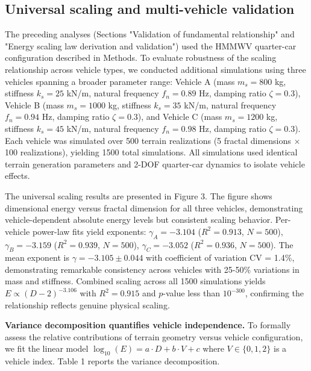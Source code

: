\documentclass[11pt]{article}
\begin{document}
\subsection*{Universal scaling and multi-vehicle validation}

The preceding analyses (Sections "Validation of fundamental relationship" and "Energy scaling law derivation and validation") used the HMMWV quarter-car configuration described in Methods. To evaluate robustness of the scaling relationship across vehicle types, we conducted additional simulations using three vehicles spanning a broader parameter range: Vehicle A (mass $m_s = 800$ kg, stiffness $k_s = 25$ kN/m, natural frequency $f_n = 0.89$ Hz, damping ratio $\zeta = 0.3$), Vehicle B (mass $m_s = 1000$ kg, stiffness $k_s = 35$ kN/m, natural frequency $f_n = 0.94$ Hz, damping ratio $\zeta = 0.3$), and Vehicle C (mass $m_s = 1200$ kg, stiffness $k_s = 45$ kN/m, natural frequency $f_n = 0.98$ Hz, damping ratio $\zeta = 0.3$). Each vehicle was simulated over 500 terrain realizations (5 fractal dimensions $\times$ 100 realizations), yielding 1500 total simulations. All simulations used identical terrain generation parameters and 2-DOF quarter-car dynamics to isolate vehicle effects.

The universal scaling results are presented in Figure 3. The figure shows dimensional energy versus fractal dimension for all three vehicles, demonstrating vehicle-dependent absolute energy levels but consistent scaling behavior. Per-vehicle power-law fits yield exponents: $\gamma_A = -3.104$ ($R^2 = 0.913$, $N = 500$), $\gamma_B = -3.159$ ($R^2 = 0.939$, $N = 500$), $\gamma_C = -3.052$ ($R^2 = 0.936$, $N = 500$). The mean exponent is $\gamma = -3.105 \pm 0.044$ with coefficient of variation CV = 1.4\%, demonstrating remarkable consistency across vehicles with 25-50\% variations in mass and stiffness. Combined scaling across all 1500 simulations yields $E \propto (D-2)^{-3.106}$ with $R^2 = 0.915$ and $p$-value less than $10^{-300}$, confirming the relationship reflects genuine physical scaling.

\textbf{Variance decomposition quantifies vehicle independence.} To formally assess the relative contributions of terrain geometry versus vehicle configuration, we fit the linear model $\log_{10}(E) = a \cdot D + b \cdot V + c$ where $V \in \{0,1,2\}$ is a vehicle index. Table 1 reports the variance decomposition.
\end{document}

